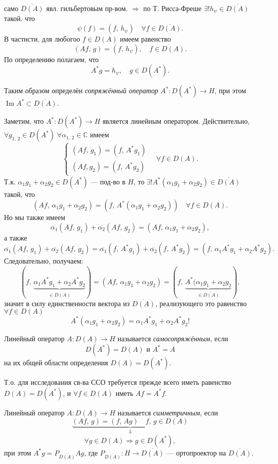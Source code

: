 \documentclass[a4paper]{article}
\begin{document}
само  $\overline{D(A)}$ явл. гильбертовым пр-вом. $\Rightarrow$ 
по Т. Рисса-Фреше $\exists! h_\psi\in \overline{D(A)}$ такой. что
\[
	\psi(f) = (f,\, h_\psi) \quad \forall f \in \overline{D(A)}
.\] 
В частнсти, для любогоо $f \in D(A)$ имеем равенство
\[
	(Af,\,g)= (f,\,h_\psi), \quad f \in D(A)
.\] 
По определению полагаем, что
\[
	A^* g = h_\psi,\quad g \in D(A^*)
.\] 
\begin{dfn}
Таким образом определён \emph{сопряжённый оператор} $A^*: D(A^*)\to H$,
при этом $\operatorname{Im}A^*\subset \overline{D(A)}$.
\end{dfn}
Заметим, что $A^* : D(A^*) \to H$
является линейным оператором. Действительно,
$\forall g_{1,\,2} \in D(A^*) \; \forall \alpha_{1,\,2} \in 
 \mathbb{C}$ имеем
 \[
\left\{
\begin{aligned}
	(Af,\, g_1) = (f,\, A^* g_1)\\
	(Af, g_2) =(f,\,A^* g_2)
\end{aligned}
\right.
\quad \forall f \in D(A)
 .\] 
 Т.\:к. $\alpha_1 g_1+\alpha_2 g_2 \in D(A^*)$ --- под-во в $H$,
 то  $\exists! A^* (\alpha_1 g_1 +\alpha_2 g_2) \in \overline{D(A)}$ 
такой, что
\[
	(Af,\, \alpha_1 g_1+\alpha_2 g_2)=(f,\, A^*(\alpha_1 g_1+
	\alpha_2 g_2)) \quad \forall f \in D(A)
.\] 
Но мы также имеем
\[
	\overline{\alpha_1} (Af,\, g_1)+ \overline{\alpha_2}(Af,\, g_2)=
	(A f,\,\alpha_1 g_1+\alpha_2 g_2)
 ,\]
а также
\[
	\overline{\alpha_1}(Af,\, g_1) +\overline{\alpha_2} (Af,\,g_2)= \overline{\alpha_1} (f,\,
	A^* g_1)+ \overline{\alpha_2} (f,\, A^* g_2)=
	(f,\,\alpha_1 A^* g_1+ \alpha_2 A^* g_2)
.\]
Следовательно, получаем:
\[
	\left(f,\, \underbrace{\alpha_1 A^* g_1 +\alpha_2 A^* g_2}_{\in 
	\overline{D(A)}}\right)=
	(Af,\, \alpha_1 g_1 +\alpha_2 g_2)=
	\left( f,\, \underbrace{A^*(\alpha_1 g_1 +\alpha_2 g_2}_{\in 
	\overline{D(A)}} \right) 
,\]
значит в силу единственности вектора из $\overline{D(A)}$, реализующего
это равенство $\forall f \in D(A)$
\[
	A^*(\alpha_1 g_1+\alpha_2 g_2) = \alpha_1 A^* g_1+
	\alpha_2 A^* g_2 !
\] 
\begin{dfn}
	Линейный оператор $A: D(A) \to  H$ называется
	\emph{самосопряжённым}, если
	\[
		D(A^*)=D(A) \text{ и } A^*=A
	\]
	на их общей области определения
	$D(A)=D(A^*)$.
\end{dfn}
Т.\:о. для исследования св-ва ССО требуется прежде всего иметь
равенство \underline{$D(A)=D(A^*)$}, и $\forall f \in  D(A)$ иметь
$Af= A^* f$.
 \begin{dfn}
	 Линейный оператор  $A : D(A)\to  H$ называется \emph{симметричным},
	 если 
	 \[
		 \underbrace{(Af,\, g) =(f,\,Ag) \quad f,\,g \in D(A)}_{\Downarrow}
	 \]
\[
	\forall g \in D(A) \Rightarrow g \in D(A^*),
\]
при этом $A^* g = P_{\overline{D(A)}}A g$, где
$P_{\overline{D(A)}}: H \to \overline{D(A)}$ --- ортопроектор
на $\overline{D(A)}$.
\end{dfn}
\end{document}
